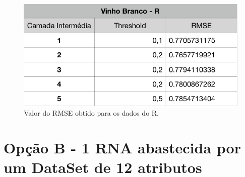 \documentclass{report}
\begin{document}
\begin{figure}[h!]
\centering
\includegraphics[scale=0.5]{tabelas/4} 
\caption{Valor do RMSE obtido para os dados do R.}
\end{figure} 










































\section{Opção B - 1 RNA abastecida por um DataSet de 12 atributos}
\end{document}
